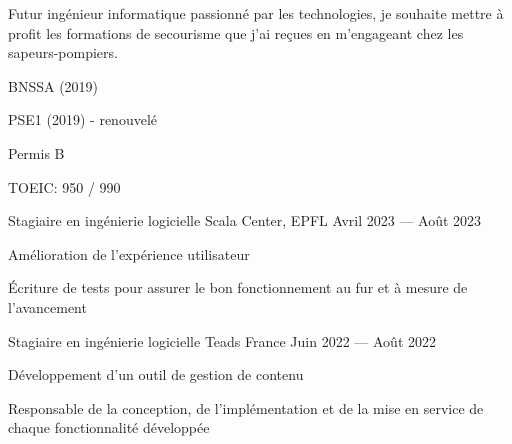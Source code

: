 \begin{MainPart}
  \color{Black}
  \vspace{0.25cm}
  {
    \vspace{-\baselineskip}
    \begin{flushleft}
      Futur ingénieur informatique passionné par les technologies, je souhaite mettre à profit les formations de secourisme que j'ai reçues en m'engageant chez les sapeurs-pompiers.
    \end{flushleft}
  }


  \begin{multicols}{2}
    \begin{ItemList}{\ColorHighlight}
      \item[\ding{72}] BNSSA (2019)
      \item[\ding{72}] PSE1 (2019) - renouvelé
    \end{ItemList}

    \begin{ItemList}{\ColorHighlight}
      \item [\ding{72}] Permis B
      \item [\ding{72}] TOEIC: 950 / 990
    \end{ItemList}
  \end{multicols}

  \Experience%
  {Stagiaire en ingénierie logicielle}
  {Scala Center, EPFL}
  {Avril 2023 --- Août 2023}
  {
    \begin{ItemList}{\ColorHighlight}
      \item[\ding{226}] Amélioration de l'expérience utilisateur
      \item[\ding{226}] Écriture de tests pour assurer le bon fonctionnement au fur et à mesure de l'avancement
    \end{ItemList}
  }
  \Experience%
  {Stagiaire en ingénierie logicielle}
  {Teads France}
  {Juin 2022 --- Août 2022}
  {
    \begin{ItemList}{\ColorHighlight}
      \item[\ding{226}] Développement d'un outil de gestion de contenu
      \item[\ding{226}] Responsable de la conception, de l'implémentation et de la mise en service de chaque fonctionnalité développée
    \end{ItemList}
  }


\end{MainPart}
